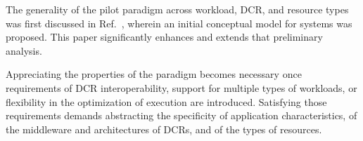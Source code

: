 \documentclass{sig-alternate}
\begin{document}

The generality of the pilot paradigm across workload, DCR, and resource types
was first discussed in Ref.~\cite{luckow2012}, wherein an initial conceptual
model for \pilot systems was proposed. This paper significantly enhances and
extends that preliminary analysis.

Appreciating the properties of the \pilot paradigm becomes necessary once
requirements of DCR interoperability, support for multiple types of workloads,
or flexibility in the optimization of execution are introduced. Satisfying those
requirements demands abstracting the specificity of application characteristics,
of the middleware and architectures of DCRs, and of the types of resources.

 



\end{document}
